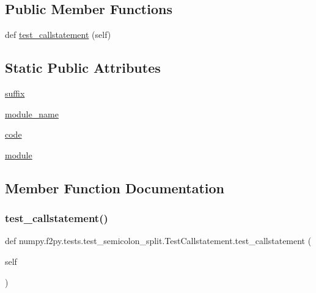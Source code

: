 \subsection*{Public Member Functions}
\begin{DoxyCompactItemize}
\item 
def \hyperlink{classnumpy_1_1f2py_1_1tests_1_1test__semicolon__split_1_1TestCallstatement_a6e16f377e57ac19d07f4556eda4df3fc}{test\+\_\+callstatement} (self)
\end{DoxyCompactItemize}
\subsection*{Static Public Attributes}
\begin{DoxyCompactItemize}
\item 
\hyperlink{classnumpy_1_1f2py_1_1tests_1_1test__semicolon__split_1_1TestCallstatement_a8b9a53b37f1469e277b7087e872cbe3e}{suffix}
\item 
\hyperlink{classnumpy_1_1f2py_1_1tests_1_1test__semicolon__split_1_1TestCallstatement_a4da7fa650a79475e006ae24666abb42e}{module\+\_\+name}
\item 
\hyperlink{classnumpy_1_1f2py_1_1tests_1_1test__semicolon__split_1_1TestCallstatement_ab7c0897e1dd2f109a3660eab61e0a214}{code}
\item 
\hyperlink{classnumpy_1_1f2py_1_1tests_1_1test__semicolon__split_1_1TestCallstatement_a936c5ec86f60685c88805a405216fb92}{module}
\end{DoxyCompactItemize}


\subsection{Member Function Documentation}
\mbox{\label{classnumpy_1_1f2py_1_1tests_1_1test__semicolon__split_1_1TestCallstatement_a6e16f377e57ac19d07f4556eda4df3fc}} 
\subsubsection{\texorpdfstring{test\+\_\+callstatement()}{test\_callstatement()}}
{\footnotesize\ttfamily def numpy.\+f2py.\+tests.\+test\+\_\+semicolon\+\_\+split.\+Test\+Callstatement.\+test\+\_\+callstatement (\begin{DoxyParamCaption}\item[{}]{self }\end{DoxyParamCaption})}



